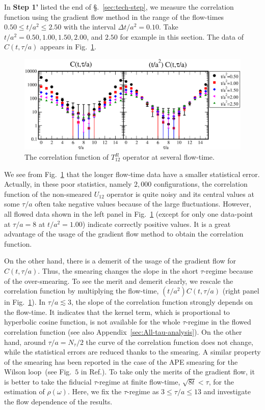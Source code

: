 \documentclass[a4paper,11pt]{article}
\begin{document}
 
In {\bf Step 1'} listed the end of \S.~\ref{sec:tech-step}, we measure the correlation function using the gradient flow method in the range of the flow-times $0.50 \le t/a^2 \le 2.50$ with the interval $\Delta t/a^2=0.10$.
Take $t/a^2 = 0.50,1.00,1.50,2.00$, and $2.50$ for example in this section.
The data of $C(t,\tau/a)$ appears in Fig.~\ref{fig:Ctau-ft-deps}.
\begin{figure}[h]
\begin{center}
\includegraphics[scale=0.5]{./Center-Ctau-ft-deps-2.pdf}
\caption{The correlation function of $T_{12}^R$ operator at several flow-time.  }
\label{fig:Ctau-ft-deps}
\end{center}
\end{figure}
We see from Fig.~\ref{fig:Ctau-ft-deps} that the longer flow-time data have a smaller statistical error.
Actually, in these poor statistics, namely $2,000$ configurations, the correlation function of the non-smeared $U_{12}$ operator is quite noisy and its central values at some $\tau/a$ often take negative values because of the large fluctuations.
However, all flowed data shown in the left panel in Fig.~\ref{fig:Ctau-ft-deps} (except for only one data-point at $\tau/a=8$ at $t/a^2=1.00$) indicate correctly positive values.
It is a great advantage of the usage of the gradient flow method to obtain the correlation function.

On the other hand, there is a demerit of the usage of the gradient flow for $C(t,\tau/a)$.
Thus, the smearing changes the slope in the short $\tau$-regime because of the over-smearing.
To see the merit and demerit clearly, we rescale the correlation function by multiplying the flow-time, $(t/a^2)C(t,\tau/a)$ (right panel in  Fig.~\ref{fig:Ctau-ft-deps}).
In $\tau/a \lesssim 3$, the slope of the correlation function strongly depends on the flow-time.
It indicates that the kernel term, which is proportional to hyperbolic cosine function, is not available for the whole $\tau$-regime in the flowed correlation function (see also Appendix~\ref{sec:All-tau-analysis}).
On the other hand, around $\tau/a = N_\tau/2 $ the curve of the correlation function does not change, while the statistical errors are reduced thanks to the smearing.
A similar property of the smearing has been reported in the case of the APE smearing for the Wilson loop~(see Fig.~$5$ in Ref.\cite{Bilgici:2009kh}).
To take only the merits of the gradient flow, it is better to take the fiducial $\tau$-regime at  finite flow-time, $\sqrt{8t} < \tau$, for the estimation of $\rho(\omega)$.
Here, we  fix the $\tau$-regime as $3 \le \tau/a \le 13 $ and investigate the flow dependence of the results.
\end{document}
